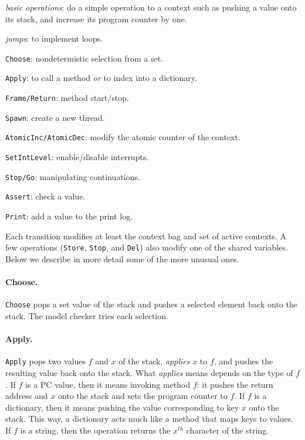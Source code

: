 \documentclass[twocolumn]{article}
\begin{document}
\begin{compactitem}
\item \emph{basic operations}: do a simple operation to a context
such as pushing a value onto its stack, and increase its program
counter by one.
\item \emph{jumps}: to implement loops.
\item \texttt{Choose}: nondetermistic selection from a set.
\item \texttt{Apply}: to call a method \emph{or} to index into a dictionary.
\item \texttt{Frame/Return}: method start/stop.
\item \texttt{Spawn}: create a new thread.
\item \texttt{AtomicInc/AtomicDec}: modify the atomic counter of the context.
\item \texttt{SetIntLevel}: enable/disable interrupts.
\item \texttt{Stop/Go}: manipulating continuations.
\item \texttt{Assert}: check a value.
\item \texttt{Print}: add a value to the print log.
\end{compactitem}

Each transition modifies at least the context bag and set of active
contexts.
A few operations (\texttt{Store}, \texttt{Stop}, and \texttt{Del})
also modify one of the shared variables.
Below we describe in more detail some of the more unusual ones.

\paragraph{Choose.} \texttt{Choose} pops a set value of the stack
and pushes a selected element back onto the stack.  The model checker
tries each selection.

\paragraph{Apply.}  \texttt{Apply} pops two values $f$ and $x$ of the stack,
\emph{applies} $x$ to $f$, and pushes the resulting value back onto the
stack.  What \emph{applies} means depends on the type of $f$.  If $f$ is
a PC value, then it means invoking method $f$: it pushes the return address
and $x$ onto the stack and sets the program counter to $f$.  If $f$ is a
dictionary, then it means pushing the value corresponding to key $x$ onto
the stack.  This way, a dictionary acts much like a method that maps keys
to values.  If $f$ is a string, then the operation returns the $x^{th}$
character of the string.
\end{document}

